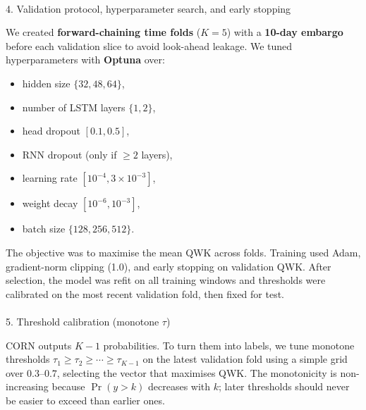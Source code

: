 \documentclass[
  letterpaper,
  DIV=11,
  numbers=noendperiod]{scrartcl}
\makeatletter
\let\oldparagraph\paragraph
\renewcommand{\paragraph}{
    \@ifstar
      \xxxParagraphStar
      \xxxParagraphNoStar
  }
\newcommand{\xxxParagraphStar}[1]{\oldparagraph*{#1}\mbox{}}
\newcommand{\xxxParagraphNoStar}[1]{\oldparagraph{#1}\mbox{}}
\providecommand{\tightlist}{%
  \setlength{\itemsep}{0pt}\setlength{\parskip}{0pt}}\usepackage{longtable,booktabs,array}
\makeatother
\begin{document}
\paragraph{4. Validation protocol, hyperparameter search, and early
stopping}\label{validation-protocol-hyperparameter-search-and-early-stopping}

We created \textbf{forward-chaining time folds} (\(K=5\)) with a
\textbf{10-day embargo} before each validation slice to avoid look-ahead
leakage. We tuned hyperparameters with \textbf{Optuna} over:

\begin{itemize}
\tightlist
\item
  hidden size \(\{32, 48, 64\}\),\\
\item
  number of LSTM layers \(\{1, 2\}\),\\
\item
  head dropout \([0.1, 0.5]\),\\
\item
  RNN dropout (only if \(\geq 2\) layers),~
\item
  learning rate \([10^{-4}, 3 \times 10^{-3}]\),\\
\item
  weight decay \([10^{-6}, 10^{-3}]\),\\
\item
  batch size \(\{128, 256, 512\}\).
\end{itemize}

The objective was to maximise the mean QWK across folds. Training used
Adam, gradient-norm clipping (1.0), and early stopping on validation
QWK. After selection, the model was refit on all training windows and
thresholds were calibrated on the most recent validation fold, then
fixed for test.

\paragraph{\texorpdfstring{5. Threshold calibration (monotone
\(\tau\))}{5. Threshold calibration (monotone \textbackslash tau)}}\label{threshold-calibration-monotone-tau}

CORN outputs \(K - 1\) probabilities. To turn them into labels, we tune
monotone thresholds \(\tau_1 \ge \tau_2 \ge \cdots \ge \tau_{K-1}\) on
the latest validation fold using a simple grid over \(0.3\)--\(0.7\),
selecting the vector that maximises QWK. The monotonicity is
non-increasing because \(\Pr(y > k)\) decreases with \(k\); later
thresholds should never be easier to exceed than earlier ones.
\end{document}
